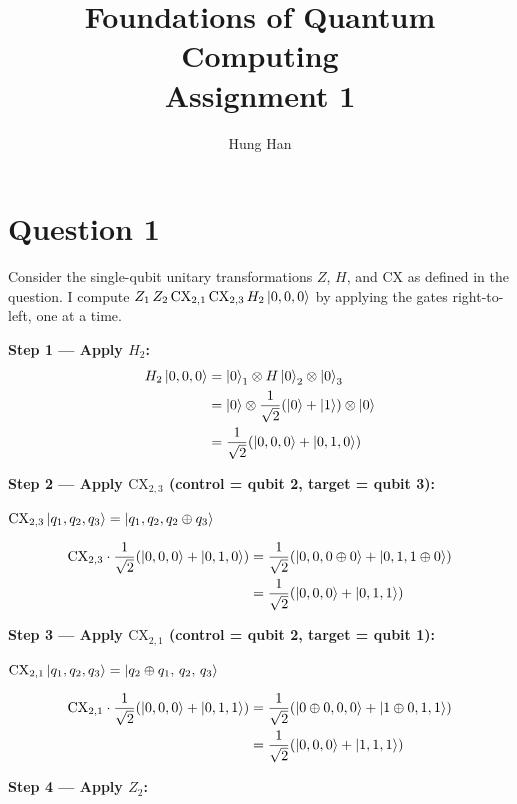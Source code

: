 \documentclass[12pt,a4paper]{article}
\title{\textbf{Foundations of Quantum Computing}\\[0.5em]
       \large Assignment 1}
\author{Hung Han}
\date{}
\begin{document}
\maketitle
\thispagestyle{empty}

\section*{Question 1}

Consider the single-qubit unitary transformations $Z$, $H$, and $\mathrm{CX}$ as defined
in the question. I compute $Z_1\,Z_2\,\mathrm{CX}_{2,1}\,\mathrm{CX}_{2,3}\,H_2\ket{0,0,0}$
by applying the gates right-to-left, one at a time.

\medskip
\textbf{Step 1 --- Apply $H_2$:}
\begin{align*}
H_2\ket{0,0,0}
  &= \ket{0}_1 \otimes H\ket{0}_2 \otimes \ket{0}_3 \\
  &= \ket{0} \otimes \frac{1}{\sqrt{2}}\!\left(\ket{0}+\ket{1}\right) \otimes \ket{0} \\
  &= \frac{1}{\sqrt{2}}\!\left(\ket{0,0,0}+\ket{0,1,0}\right)
\end{align*}

\textbf{Step 2 --- Apply $\mathrm{CX}_{2,3}$ (control = qubit 2, target = qubit 3):}

$\mathrm{CX}_{2,3}\ket{q_1,q_2,q_3}=\ket{q_1,q_2,q_2\oplus q_3}$

\begin{align*}
\mathrm{CX}_{2,3}\cdot\frac{1}{\sqrt{2}}\!\left(\ket{0,0,0}+\ket{0,1,0}\right)
  &= \frac{1}{\sqrt{2}}\!\left(\ket{0,0,0\oplus 0}+\ket{0,1,1\oplus 0}\right) \\
  &= \frac{1}{\sqrt{2}}\!\left(\ket{0,0,0}+\ket{0,1,1}\right)
\end{align*}

\textbf{Step 3 --- Apply $\mathrm{CX}_{2,1}$ (control = qubit 2, target = qubit 1):}

$\mathrm{CX}_{2,1}\ket{q_1,q_2,q_3}=\ket{q_2\oplus q_1,\,q_2,\,q_3}$

\begin{align*}
\mathrm{CX}_{2,1}\cdot\frac{1}{\sqrt{2}}\!\left(\ket{0,0,0}+\ket{0,1,1}\right)
  &= \frac{1}{\sqrt{2}}\!\left(\ket{0\oplus 0,0,0}+\ket{1\oplus 0,1,1}\right) \\
  &= \frac{1}{\sqrt{2}}\!\left(\ket{0,0,0}+\ket{1,1,1}\right)
\end{align*}

\textbf{Step 4 --- Apply $Z_2$:}
\end{document}
